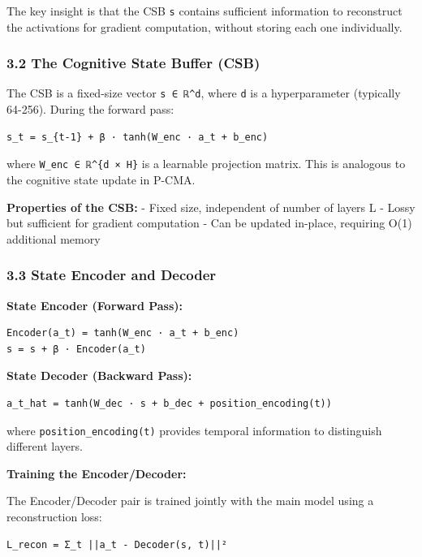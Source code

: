 \documentclass[
  11pt,
  a4paper,
]{article}
\begin{document}
The key insight is that the CSB \texttt{s} contains sufficient
information to reconstruct the activations for gradient computation,
without storing each one individually.

\subsubsection{3.2 The Cognitive State Buffer
(CSB)}\label{the-cognitive-state-buffer-csb}

The CSB is a fixed-size vector \texttt{s\ ∈\ ℝ\^{}d}, where \texttt{d}
is a hyperparameter (typically 64-256). During the forward pass:

\begin{verbatim}
s_t = s_{t-1} + β · tanh(W_enc · a_t + b_enc)
\end{verbatim}

where \texttt{W\_enc\ ∈\ ℝ\^{}\{d\ ×\ H\}} is a learnable projection
matrix. This is analogous to the cognitive state update in P-CMA.

\textbf{Properties of the CSB:} - Fixed size, independent of number of
layers L - Lossy but sufficient for gradient computation - Can be
updated in-place, requiring O(1) additional memory

\subsubsection{3.3 State Encoder and
Decoder}\label{state-encoder-and-decoder}

\textbf{State Encoder (Forward Pass):}

\begin{verbatim}
Encoder(a_t) = tanh(W_enc · a_t + b_enc)
s = s + β · Encoder(a_t)
\end{verbatim}

\textbf{State Decoder (Backward Pass):}

\begin{verbatim}
a_t_hat = tanh(W_dec · s + b_dec + position_encoding(t))
\end{verbatim}

where \texttt{position\_encoding(t)} provides temporal information to
distinguish different layers.

\textbf{Training the Encoder/Decoder:}

The Encoder/Decoder pair is trained jointly with the main model using a
reconstruction loss:

\begin{verbatim}
L_recon = Σ_t ||a_t - Decoder(s, t)||²
\end{verbatim}
\end{document}
